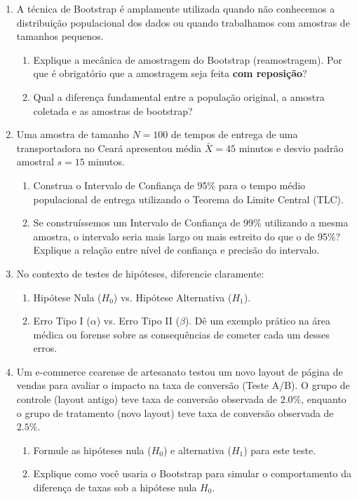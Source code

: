 \documentclass[12pt]{article}
\begin{document}
\begin{enumerate}[label=\textbf{Questão \arabic*}]
    \item A técnica de Bootstrap é amplamente utilizada quando não conhecemos a distribuição populacional dos dados ou quando trabalhamos com amostras de tamanhos pequenos.
    \begin{enumerate}[label=\alph*)]
        \item Explique a mecânica de amostragem do Bootstrap (reamostragem). Por que é obrigatório que a amostragem seja feita \textbf{com reposição}?
        \item Qual a diferença fundamental entre a população original, a amostra coletada e as amostras de bootstrap?
    \end{enumerate}

    \item Uma amostra de tamanho $N = 100$ de tempos de entrega de uma transportadora no Ceará apresentou média $\bar{X} = 45$ minutos e desvio padrão amostral $s = 15$ minutos.
    \begin{enumerate}[label=\alph*)]
        \item Construa o Intervalo de Confiança de 95\% para o tempo médio populacional de entrega utilizando o Teorema do Limite Central (TLC).
        \item Se construíssemos um Intervalo de Confiança de 99\% utilizando a mesma amostra, o intervalo seria mais largo ou mais estreito do que o de 95\%? Explique a relação entre nível de confiança e precisão do intervalo.
    \end{enumerate}

    \item No contexto de testes de hipóteses, diferencie claramente:
    \begin{enumerate}[label=\alph*)]
        \item Hipótese Nula ($H_0$) vs. Hipótese Alternativa ($H_1$).
        \item Erro Tipo I ($\alpha$) vs. Erro Tipo II ($\beta$). Dê um exemplo prático na área médica ou forense sobre as consequências de cometer cada um desses erros.
    \end{enumerate}

    \item Um e-commerce cearense de artesanato testou um novo layout de página de vendas para avaliar o impacto na taxa de conversão (Teste A/B). O grupo de controle (layout antigo) teve taxa de conversão observada de $2.0\%$, enquanto o grupo de tratamento (novo layout) teve taxa de conversão observada de $2.5\%$.
    \begin{enumerate}[label=\alph*)]
        \item Formule as hipóteses nula ($H_0$) e alternativa ($H_1$) para este teste.
        \item Explique como você usaria o Bootstrap para simular o comportamento da diferença de taxas sob a hipótese nula $H_0$.
    \end{enumerate}


\end{enumerate}
\end{document}
